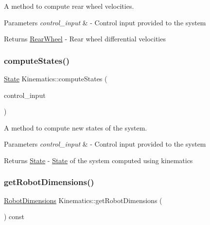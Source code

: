 A method to compute rear wheel velocities. 


\begin{DoxyParams}{Parameters}
{\em control\+\_\+input} & -\/ Control input provided to the system \\
\hline
\end{DoxyParams}
\begin{DoxyReturn}{Returns}
\hyperlink{structRearWheel}{Rear\+Wheel} -\/ Rear wheel differential velocities 
\end{DoxyReturn}
\mbox{\label{classKinematics_abc359954c01ed158fe090e01b5539f06}} 
\subsubsection{\texorpdfstring{compute\+States()}{computeStates()}}
{\footnotesize\ttfamily \hyperlink{structState}{State} Kinematics\+::compute\+States (\begin{DoxyParamCaption}\item[{ackermann\+\_\+msgs\+::\+Ackermann\+Drive\+Stamped \&}]{control\+\_\+input }\end{DoxyParamCaption})}



A method to compute new states of the system. 


\begin{DoxyParams}{Parameters}
{\em control\+\_\+input} & -\/ Control input provided to the system \\
\hline
\end{DoxyParams}
\begin{DoxyReturn}{Returns}
\hyperlink{structState}{State} -\/ \hyperlink{structState}{State} of the system computed using kinematics 
\end{DoxyReturn}
\mbox{\label{classKinematics_a8f16185dd4942d6423d3ac4997de839f}} 
\subsubsection{\texorpdfstring{get\+Robot\+Dimensions()}{getRobotDimensions()}}
{\footnotesize\ttfamily \hyperlink{structRobotDimensions}{Robot\+Dimensions} Kinematics\+::get\+Robot\+Dimensions (\begin{DoxyParamCaption}{ }\end{DoxyParamCaption}) const}



